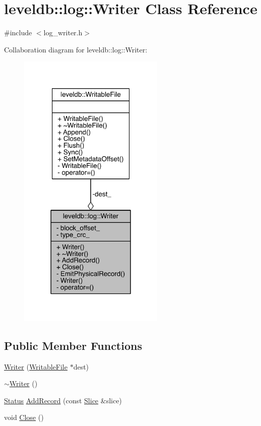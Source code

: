 \hypertarget{classleveldb_1_1log_1_1_writer}{}\section{leveldb\+:\+:log\+:\+:Writer Class Reference}
\label{classleveldb_1_1log_1_1_writer}


{\ttfamily \#include $<$log\+\_\+writer.\+h$>$}



Collaboration diagram for leveldb\+:\+:log\+:\+:Writer\+:\nopagebreak
\begin{figure}[H]
\begin{center}
\leavevmode
\includegraphics[width=198pt]{classleveldb_1_1log_1_1_writer__coll__graph}
\end{center}
\end{figure}
\subsection*{Public Member Functions}
\begin{DoxyCompactItemize}
\item 
\hyperlink{classleveldb_1_1log_1_1_writer_a424f67be4485fdf3ef8ba55c9c559c90}{Writer} (\hyperlink{classleveldb_1_1_writable_file}{Writable\+File} $\ast$dest)
\item 
\hyperlink{classleveldb_1_1log_1_1_writer_a71bcdee2a87eb535fd60a3fe047e66be}{$\sim$\+Writer} ()
\item 
\hyperlink{classleveldb_1_1_status}{Status} \hyperlink{classleveldb_1_1log_1_1_writer_acb4abda5a5348ac1771657ff01bf2fad}{Add\+Record} (const \hyperlink{classleveldb_1_1_slice}{Slice} \&slice)
\item 
void \hyperlink{classleveldb_1_1log_1_1_writer_a39bab777c8bb27cb3e5cda05fd3b4438}{Close} ()
\end{DoxyCompactItemize}

